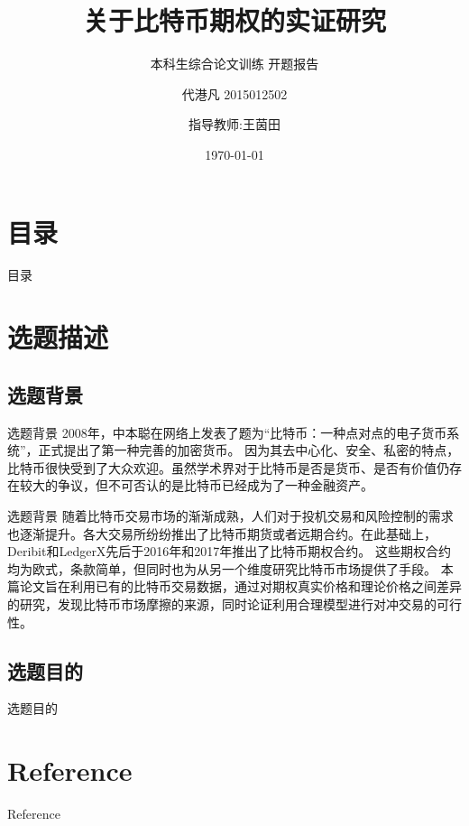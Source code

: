 \documentclass[11pt,dark]{mathbeamer}
\title{关于比特币期权的实证研究 }
\subtitle{本科生综合论文训练 开题报告}
\author[代港凡 2015012502]{代港凡 2015012502 \and 指导教师:王茵田}
\institute{清华大学经济管理学院}
\date{\today}
\begin{document}
\section*{目录}
\begin{frame}{目录}
    \tableofcontents
\end{frame}
\section{选题描述}
\frame{\tableofcontents[currentsection]}
\subsection{选题背景}
\begin{frame}{选题背景}
    2008年，中本聪在网络上发表了题为“比特币：一种点对点的电子货币系统”\cite{Nakamoto_bitcoin:a}，正式提出了第一种完善的加密货币。
    因为其去中心化、安全、私密的特点，比特币很快受到了大众欢迎。虽然学术界对于比特币是否是货币、是否有价值仍存在较大的争议，但不可否认的是比特币已经成为了一种金融资产。
\end{frame}
\begin{frame}{选题背景}
    随着比特币交易市场的渐渐成熟，人们对于投机交易和风险控制的需求也逐渐提升。各大交易所纷纷推出了比特币期货或者远期合约。在此基础上，Deribit和LedgerX先后于2016年和2017年推出了比特币期权合约。
    \newline 这些期权合约均为欧式，条款简单，但同时也为从另一个维度研究比特币市场提供了手段。
    \newline 本篇论文旨在利用已有的比特币交易数据，通过对期权真实价格和理论价格之间差异的研究，发现比特币市场摩擦的来源，同时论证利用合理模型进行对冲交易的可行性。
  \end{frame}
\subsection{选题目的}
\begin{frame}{选题目的}
  
\end{frame}
\section{Reference}
    \begin{frame}[t, allowframebreaks]{Reference}
        
		
	\end{frame}
\end{document}
